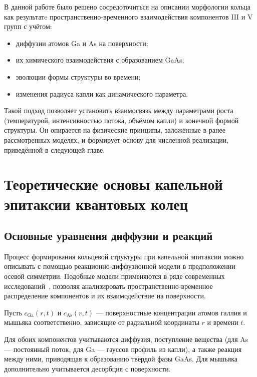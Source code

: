 \documentclass[14pt,oneside]{extarticle}
\begin{document}
В данной работе было решено сосредоточиться на описании морфологии кольца как результатe пространственно-временного взаимодействия компонентов III и V групп с учётом:
\begin{itemize}
    \item диффузии атомов Ga и As на поверхности;
    \item их химического взаимодействия с образованием GaAs;
    \item эволюции формы структуры во времени;
    \item изменения радиуса капли как динамического параметра.
\end{itemize}

Такой подход позволяет установить взаимосвязь между параметрами роста (температурой, интенсивностью потока, объёмом капли) и конечной формой структуры. Он опирается на физические принципы, заложенные в ранее рассмотренных моделях, и формирует основу для численной реализации, приведённой в следующей главе.

\pagebreak

\section{Теоретические основы капельной эпитаксии квантовых колец}

\subsection{Основные уравнения диффузии и реакций}

Процесс формирования кольцевой структуры при капельной эпитаксии можно описывать с помощью реакционно-диффузионной модели в предположении осевой симметрии. Подобные модели применяются в ряде современных исследований~\cite{reyes2013, bietti2020}, позволяя анализировать пространственно-временное распределение компонентов и их взаимодействие на поверхности.

Пусть $c_{\text{Ga}}(r,t)$ и $c_{\text{As}}(r,t)$ — поверхностные концентрации атомов галлия и мышьяка соответственно, зависящие от радиальной координаты $r$ и времени $t$.

Для обоих компонентов учитываются диффузия, поступление вещества (для As — постоянный поток, для Ga — гауссов профиль из капли), а также реакция между ними, приводящая к образованию твёрдой фазы GaAs. Для мышьяка дополнительно учитывается десорбция с поверхности.
\end{document}
